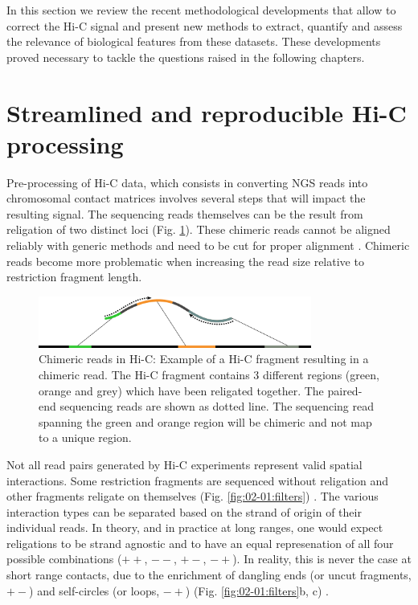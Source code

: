 In this section we review the recent methodological developments that allow to correct the Hi-C signal and present new methods to extract, quantify and assess the relevance of biological features from these datasets. These developments proved necessary to tackle the questions raised in the following chapters.


\section{Streamlined and reproducible Hi-C processing}
\label{sec:02-01:streamlined-processing}

Pre-processing of Hi-C data, which consists in converting \acrfull{NGS} reads into chromosomal contact matrices involves several steps that will impact the resulting signal. The sequencing reads themselves can be the result from religation of two distinct loci (Fig. \ref{fig:02-01:chimeric}). These chimeric reads cannot be aligned reliably with generic methods and need to be cut for proper alignment \cite{lajoieHitchhikerGuideHiC2015}. Chimeric reads become more problematic when increasing the read size relative to restriction fragment length.

\begin{figure}[htb]
    \includegraphics[width=0.8\textwidth]{Parts/Part02/gfx/hicstuff/chimeric.pdf}
    \caption[Chimeric reads in Hi-C.]{Chimeric reads in Hi-C: Example of a Hi-C fragment resulting in a chimeric read. The Hi-C fragment contains 3 different regions (green, orange and grey) which have been religated together. The paired-end sequencing reads are shown as dotted line. The sequencing read spanning the green and orange region will be chimeric and not map to a unique region.}
    \label{fig:02-01:chimeric}
\end{figure}

Not all read pairs generated by Hi-C experiments represent valid spatial interactions. Some restriction fragments are sequenced without religation and other fragments religate on themselves (Fig. \ref{fig:02-01:filters}) \cite{cournacNormalizationChromosomalContact2012}. The various interaction types can be separated based on the strand of origin of their individual reads. In theory, and in practice at long ranges, one would expect religations to be strand agnostic and to have an equal represenation of all four possible combinations ($++$, $--$, $+-$, $-+$). In reality, this is never the case at short range contacts, due to the enrichment of dangling ends (or uncut fragments, $+-$) and self-circles (or loops, $-+$) (Fig. \ref{fig:02-01:filters}b, c) \cite{cournacNormalizationChromosomalContact2012}.

